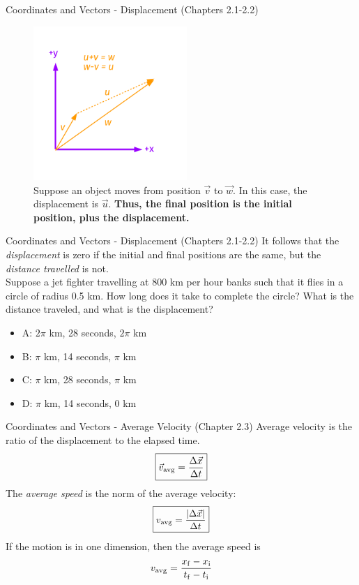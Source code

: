 \documentclass{beamer}
\begin{document}
\begin{frame}{Coordinates and Vectors - Displacement (Chapters 2.1-2.2)}
\begin{figure}
\centering
\includegraphics[width=0.52\textwidth]{figures/Vectors4.pdf}
\caption{\label{fig:displacement} Suppose an object moves from position $\vec{v}$ to $\vec{w}$.  In this case, the \alert{displacement} is $\vec{u}$. \textbf{Thus, the final position is the initial position, plus the displacement.}}
\end{figure}
\end{frame}

\begin{frame}{Coordinates and Vectors - Displacement (Chapters 2.1-2.2)}
It follows that the \textit{displacement} is zero if the initial and final positions are the same, but the \textit{distance travelled} is not.\\
\vspace{0.2cm}
\small
Suppose a jet fighter travelling at 800 km per hour banks such that it flies in a circle of radius 0.5 km.  How long does it take to complete the circle?  What is the distance traveled, and what is the displacement?
\begin{itemize}
\item A: $2\pi$ km, 28 seconds, $2\pi$ km
\item B: $\pi$ km, 14 seconds, $\pi$ km
\item C: $\pi$ km, 28 seconds, $\pi$ km
\item D: $\pi$ km, 14 seconds, $0$ km
\end{itemize}
\end{frame}

\begin{frame}{Coordinates and Vectors - Average Velocity  (Chapter 2.3)}
\alert{Average velocity} is the ratio of the \alert{displacement} to the elapsed time.\\
\begin{equation}
\boxed{\vec{v}_{\rm avg} = \frac{\Delta \vec{x}}{\Delta t}}
\end{equation}
The \textit{average speed} is the norm of the average velocity:
\begin{equation}
\boxed{v_{\rm avg} = \frac{|\Delta \vec{x}|}{\Delta t}}
\end{equation}
If the motion is in one dimension, then the average speed is
\begin{equation}
v_{\rm avg} = \frac{x_{\rm f} - x_{\rm i}}{t_{\rm f} - t_{\rm i}}
\end{equation}
\end{frame}
\end{document}
